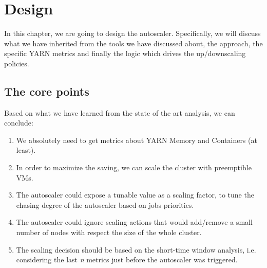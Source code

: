 \documentclass[12pt,twoside,cucitura]{toptesi}
\begin{document}
\chapter{Design}
In this chapter, we are going to design the autoscaler. Specifically, we will discuss what we have inherited from the tools we have discussed about, the approach, the specific YARN metrics and finally the logic which drives the up/downscaling policies.

\section{The core points}
Based on what we have learned from the state of the art analysis, we can conclude:
\begin{enumerate}
	\item We absolutely need to get metrics about YARN Memory and Containers (at least).
	\item In order to maximize the saving, we can scale the cluster with preemptible VMs.
	\item The autoscaler could expose a tunable value as a scaling factor, to tune the chasing degree of the autoscaler based on jobs priorities.
	\item The autoscaler could ignore scaling actions that would add/remove a small number of nodes with respect the size of the whole cluster.
	\item The scaling decision should be based on the short-time window analysis, i.e. considering the last \textit{n} metrics just before the autoscaler was triggered.
\end{enumerate}
\end{document}
